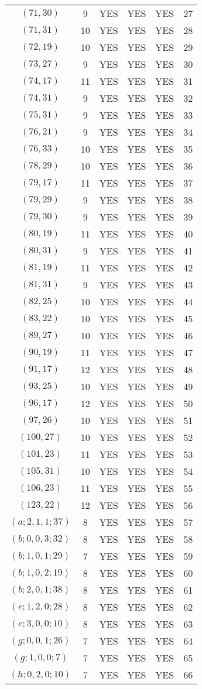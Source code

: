 \begin{longtable}{|c|c|c|c|c|c|}
$(71, 30)$ & 9 & YES & YES & YES & 27\\
$(71, 31)$ & 10 & YES & YES & YES & 28\\
$(72, 19)$ & 10 & YES & YES & YES & 29\\
$(73, 27)$ & 9 & YES & YES & YES & 30\\
$(74, 17)$ & 11 & YES & YES & YES & 31\\
$(74, 31)$ & 9 & YES & YES & YES & 32\\
$(75, 31)$ & 9 & YES & YES & YES & 33\\
$(76, 21)$ & 9 & YES & YES & YES & 34\\
$(76, 33)$ & 10 & YES & YES & YES & 35\\
$(78, 29)$ & 10 & YES & YES & YES & 36\\
$(79, 17)$ & 11 & YES & YES & YES & 37\\
$(79, 29)$ & 9 & YES & YES & YES & 38\\
$(79, 30)$ & 9 & YES & YES & YES & 39\\
$(80, 19)$ & 11 & YES & YES & YES & 40\\
$(80, 31)$ & 9 & YES & YES & YES & 41\\
$(81, 19)$ & 11 & YES & YES & YES & 42\\
$(81, 31)$ & 9 & YES & YES & YES & 43\\
$(82, 25)$ & 10 & YES & YES & YES & 44\\
$(83, 22)$ & 10 & YES & YES & YES & 45\\
$(89, 27)$ & 10 & YES & YES & YES & 46\\
$(90, 19)$ & 11 & YES & YES & YES & 47\\
$(91, 17)$ & 12 & YES & YES & YES & 48\\
$(93, 25)$ & 10 & YES & YES & YES & 49\\
$(96, 17)$ & 12 & YES & YES & YES & 50\\
$(97, 26)$ & 10 & YES & YES & YES & 51\\
$(100, 27)$ & 10 & YES & YES & YES & 52\\
$(101, 23)$ & 11 & YES & YES & YES & 53\\
$(105, 31)$ & 10 & YES & YES & YES & 54\\
$(106, 23)$ & 11 & YES & YES & YES & 55\\
$(123, 22)$ & 12 & YES & YES & YES & 56\\
$(a; 2, 1, 1; 37)$ & 8 & YES & YES & YES & 57\\
$(b; 0, 0, 3; 32)$ & 8 & YES & YES & YES & 58\\
$(b; 1, 0, 1; 29)$ & 7 & YES & YES & YES & 59\\
$(b; 1, 0, 2; 19)$ & 8 & YES & YES & YES & 60\\
$(b; 2, 0, 1; 38)$ & 8 & YES & YES & YES & 61\\
$(e; 1, 2, 0; 28)$ & 8 & YES & YES & YES & 62\\
$(e; 3, 0, 0; 10)$ & 8 & YES & YES & YES & 63\\
$(g; 0, 0, 1; 26)$ & 7 & YES & YES & YES & 64\\
$(g; 1, 0, 0; 7)$ & 7 & YES & YES & YES & 65\\
$(h; 0, 2, 0; 10)$ & 7 & YES & YES & YES & 66
\end{longtable}

